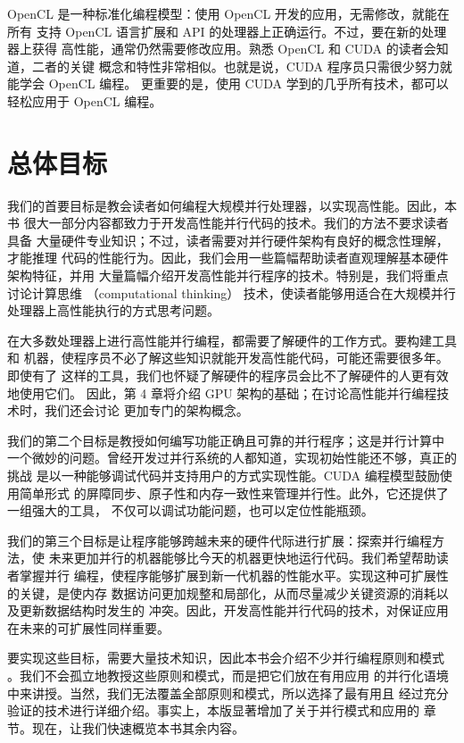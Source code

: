 OpenCL 是一种标准化编程模型：使用 OpenCL 开发的应用，无需修改，就能在所有
支持 OpenCL 语言扩展和 API 的处理器上正确运行。不过，要在新的处理器上获得
高性能，通常仍然需要修改应用。熟悉 OpenCL 和 CUDA 的读者会知道，二者的关键
概念和特性非常相似。也就是说，CUDA 程序员只需很少努力就能学会 OpenCL 编程。
更重要的是，使用 CUDA 学到的几乎所有技术，都可以轻松应用于 OpenCL 编程。

\section{总体目标}
\label{sec:overarching-goals}

我们的首要目标是教会读者如何编程大规模并行处理器，以实现高性能。因此，本书
很大一部分内容都致力于开发高性能并行代码的技术。我们的方法不要求读者具备
大量硬件专业知识；不过，读者需要对并行硬件架构有良好的概念性理解，才能推理
代码的性能行为。因此，我们会用一些篇幅帮助读者直观理解基本硬件架构特征，并用
大量篇幅介绍开发高性能并行程序的技术。特别是，我们将重点讨论计算思维
（computational thinking）\cite{wing2006} 技术，使读者能够用适合在大规模并行
处理器上高性能执行的方式思考问题。

在大多数处理器上进行高性能并行编程，都需要了解硬件的工作方式。要构建工具和
机器，使程序员不必了解这些知识就能开发高性能代码，可能还需要很多年。即使有了
这样的工具，我们也怀疑了解硬件的程序员会比不了解硬件的人更有效地使用它们。
因此，第 4 章将介绍 GPU 架构的基础；在讨论高性能并行编程技术时，我们还会讨论
更加专门的架构概念。

我们的第二个目标是教授如何编写功能正确且可靠的并行程序；这是并行计算中
一个微妙的问题。曾经开发过并行系统的人都知道，实现初始性能还不够，真正的挑战
是以一种能够调试代码并支持用户的方式实现性能。CUDA 编程模型鼓励使用简单形式
的屏障同步、原子性和内存一致性来管理并行性。此外，它还提供了一组强大的工具，
不仅可以调试功能问题，也可以定位性能瓶颈。

我们的第三个目标是让程序能够跨越未来的硬件代际进行扩展：探索并行编程方法，使
未来更加并行的机器能够比今天的机器更快地运行代码。我们希望帮助读者掌握并行
编程，使程序能够扩展到新一代机器的性能水平。实现这种可扩展性的关键，是使内存
数据访问更加规整和局部化，从而尽量减少关键资源的消耗以及更新数据结构时发生的
冲突。因此，开发高性能并行代码的技术，对保证应用在未来的可扩展性同样重要。

要实现这些目标，需要大量技术知识，因此本书会介绍不少并行编程原则和模式
\cite{mattson2004}。我们不会孤立地教授这些原则和模式，而是把它们放在有用应用
的并行化语境中来讲授。当然，我们无法覆盖全部原则和模式，所以选择了最有用且
经过充分验证的技术进行详细介绍。事实上，本版显著增加了关于并行模式和应用的
章节。现在，让我们快速概览本书其余内容。

